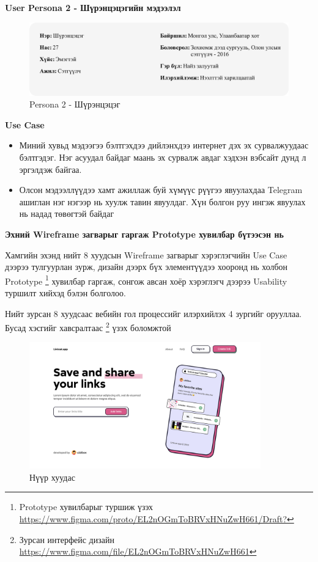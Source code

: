 \textbf{User Persona 2 - Шүрэнцэцэгийн мэдээлэл}

\begin{figure}[h]
	\centering
	\includegraphics[width=15cm]{images/persona2-shurentsetseg.png}
	\caption{Persona 2 - Шүрэнцэцэг}
	\label{fig:persona2}
\end{figure}

\textbf{Use Case}

\begin{itemize}
	\item Миний хувьд мэдээгээ бэлтгэхдээ дийлэнхдээ интернет дэх эх сурвалжуудаас бэлтгэдэг. Нэг асуудал байдаг маань эх сурвалж авдаг хэдхэн вэбсайт дунд л эргэлдэж байгаа.
	\item Олсон мэдээллүүдээ хамт ажиллаж буй хүмүүс рүүгээ явуулахдаа Telegram ашиглан нэг нэгээр нь хуулж тавин явуулдаг. Хүн болгон руу ингэж явуулах нь надад төвөгтэй байдаг
\end{itemize}

\textbf{Эхний Wireframe загварыг гаргаж Prototype хувилбар бүтээсэн нь}

Хамгийн эхэнд нийт 8 хуудсын Wireframe загварыг хэрэглэгчийн Use Case дээрээ тулгуурлан зурж, дизайн дээрх бүх элементүүдээ хооронд нь холбон Prototype \footnote{Prototype хувилбарыг туршиж үзэх \url{https://www.figma.com/proto/EL2nOGmToBRVxHNuZwH661/Draft?}} хувилбар гаргаж, сонгож авсан хоёр хэрэглэгч дээрээ Usability туршилт хийхэд бэлэн болголоо.

Нийт зурсан 8 хуудсаас вебийн гол процессийг илэрхийлэх 4 зургийг орууллаа. Бусад хэсгийг хавсралтаас \footnote{Зурсан интерфейс дизайн \url{https://www.figma.com/file/EL2nOGmToBRVxHNuZwH661}} үзэх боломжтой

\begin{figure}[h]
	\centering
	\includegraphics[width=10cm]{images/interfaces/v1/01-home.png}
	\caption{Нүүр хуудас}
	\label{fig:interface-v1-01}
\end{figure}

